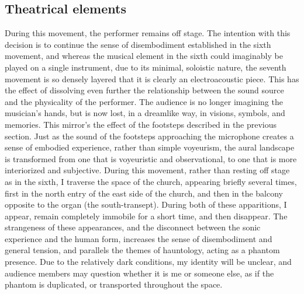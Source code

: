 \documentclass[12pt,twoside,maitrise]{dms_ks}
\theoremstyle{definition}
\begin{document}
\subsection{Theatrical elements}

During this movement, the performer remains off stage.
The intention with this decision is to continue the sense of disembodiment established in the sixth movement, and whereas the musical element in the sixth could imaginably be played on a single instrument, due to its minimal, soloistic nature, the seventh movement is so densely layered that it is clearly an electroacoustic piece.
This has the effect of dissolving even further the relationship between the sound source and the physicality of the performer.
The audience is no longer imagining the musician's hands, but is now lost, in a dreamlike way, in visions, symbols, and memories.
This mirror's the effect of the footsteps described in the previous section.
Just as the sound of the footsteps approaching the microphone creates a sense of embodied experience, rather than simple voyeurism, the aural landscape is transformed from one that is voyeuristic and observational, to one that is more interiorized and subjective.
During this movement, rather than resting off stage as in the sixth, I traverse the space of the church, appearing briefly several times, first in the north entry of the east side of the church, and then in the balcony opposite to the organ (the south-transept).
During both of these apparitions, I appear, remain completely immobile for a short time, and then disappear.
The strangeness of these appearances, and the disconnect between the sonic experience and the human form, increases the sense of disembodiment and general tension, and parallels the themes of hauntology, acting as a phantom presence.
Due to the relatively dark conditions, my identity will be unclear, and audience members may question whether it is me or someone else, as if the phantom is duplicated, or transported throughout the space.
\end{document}
